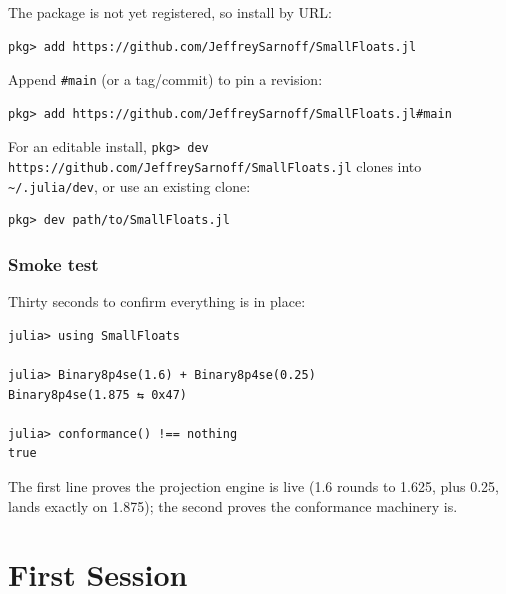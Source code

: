 \label{17214494489884574285}{}


The package is not yet registered, so install by URL:




\nopagebreak[4]
\begin{verbatim}
pkg> add https://github.com/JeffreySarnoff/SmallFloats.jl
\end{verbatim}



Append \texttt{\#main} (or a tag/commit) to pin a revision:




\nopagebreak[4]
\begin{verbatim}
pkg> add https://github.com/JeffreySarnoff/SmallFloats.jl#main
\end{verbatim}



For an editable install, \texttt{pkg> dev https:/\allowbreak{}/\allowbreak{}github.com/\allowbreak{}JeffreySarnoff/\allowbreak{}SmallFloats.jl} clones into \texttt{{\textasciitilde}/.julia/dev}, or use an existing clone:




\nopagebreak[4]
\begin{verbatim}
pkg> dev path/to/SmallFloats.jl
\end{verbatim}



\subsection{Smoke test}



\label{27876697785071805}{}


Thirty seconds to confirm everything is in place:




\nopagebreak[4]
\begin{verbatim}
julia> using SmallFloats

julia> Binary8p4se(1.6) + Binary8p4se(0.25)
Binary8p4se(1.875 ⇆ 0x47)

julia> conformance() !== nothing
true
\end{verbatim}



The first line proves the projection engine is live (1.6 rounds to 1.625, plus 0.25, lands exactly on 1.875); the second proves the conformance machinery is.



\chapter{First Session}


